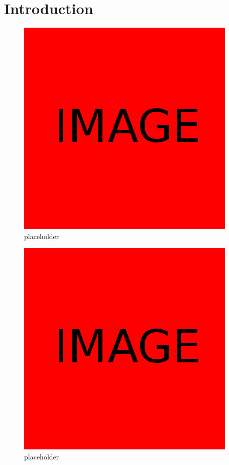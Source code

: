 \documentclass{article}
\begin{document}
\section{Introduction}
\begin{figure}[h]
  \centering
  \includegraphics[scale=0.3]{placeholder}
  \caption{placeholder}
  \label{fig:placeholder1}
\end{figure}
\begin{figure}[h]
  \centering
  \includegraphics[scale=0.3]{placeholder}
  \caption{placeholder}
  \label{fig:placeholder2}
\end{figure}
\end{document}
